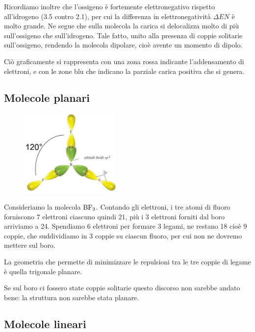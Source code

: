 Ricordiamo inoltre che l'ossigeno è fortemente elettronegativo rispetto all'idrogeno (3.5 contro 2.1), per cui la differenza in elettronegatività $\Delta EN$ è molto grande. Ne segue che sulla molecola la carica si delocalizza molto di più sull'ossigeno che sull'idrogeno. Tale fatto, unito alla presenza di coppie solitarie sull'ossigeno, rendendo la molecola dipolare, cioè avente un momento di dipolo.

Ciò graficamente si rappresenta con una zona rossa indicante l'addensamento di elettroni, e con le zone blu che indicano la parziale carica positiva che si genera.

\subsection{Molecole planari}
\vspace{-0.4cm}
\begin{minipage}{0.4\textwidth}
    \begin{figure}[H]
        \includegraphics[width=5cm]{immagini/BF_3.png} 
    \end{figure}
\end{minipage}
\hfill
\begin{minipage}{0.6\textwidth}
\vspace{0.6cm}Consideriamo la molecola $\rm BF_3$. Contando gli elettroni, i tre atomi di fluoro forniscono 7 elettroni ciascuno quindi 21, più i 3 elettroni forniti dal boro arriviamo a 24. Spendiamo 6 elettroni  per formare 3 legami, ne restano 18 cioè 9 coppie, che suddividiamo in 3 coppie su ciascun fluoro, per cui non ne dovremo mettere sul boro.

La geometria che permette di minimizzare le repulsioni tra le tre coppie di legame è quella trigonale planare.

Se sul boro ci fossero state coppie solitarie questo discorso non sarebbe andato bene: la struttura non sarebbe stata planare.
\end{minipage}

\subsection{Molecole lineari}

